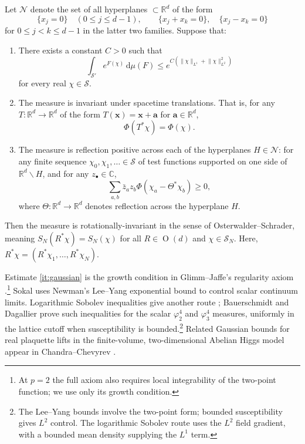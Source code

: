 \documentclass[11pt, letterpaper, reqno]{amsart}
\theoremstyle{definition}
\newenvironment{theorem}
{\pushQED{\qed}\renewcommand{\qedsymbol}{$\blacksquare\square$}\theoremxx}
{\popQED\endtheoremxx}
\theoremstyle{remark}
\newcommand{\bbC}{\mathbb{C}}
\newcommand{\bbR}{\mathbb{R}}
\newcommand{\calN}{\mathcal{N}}
\newcommand{\calS}{\mathcal{S}}
\newcommand{\bfa}{\mathbf{a}}
\newcommand{\bfx}{\mathbf{x}}
\newcommand{\dd}{\,\mathrm{d}}
\begin{document}
Let $\calN$ denote the set of all hyperplanes $\subset \bbR^d$ of the form 
\begin{equation}
    \{x_j=0\}\quad(0\leq j\leq d-1),\qquad \{x_j+x_k=0\},\quad \{x_j-x_k=0\}
\end{equation}
for $0\leq j<k\leq d-1$ in the latter two families. 
\begin{theorem} 
\label{thm:main}
Suppose that:
\begin{enumerate}[label=(\roman*)]
\item \label{it:gaussian} There exists a constant $C>0$ such that 
\begin{equation}\label{eq:gaussian}
    \int_{\calS'} e^{F(\chi)} \dd \mu(F) \leq e^{C(\lVert\chi\rVert_{L^1}+\lVert\chi\rVert_{L^2}^2)}
\end{equation}
for every real $\chi\in\calS$. 
\item  \label{it:cov}
The measure is invariant under spacetime translations. That is, for any $T:\bbR^d\to \bbR^d$ of the form $T(\bfx)=\bfx+\bfa$ for $\bfa\in \bbR^d$, 
\begin{equation}
    \Phi(T^* \chi) = \Phi(\chi). 
\end{equation}
\item The measure is reflection positive across each of the hyperplanes $H\in \calN$: for any finite sequence $\chi_0,\chi_1,\dots \in \calS$ of test functions supported on one side of $\bbR^d\backslash H$, and for any $z_\bullet\in \bbC$, 
\begin{equation}
    \sum_{a,b} \bar{z}_a z_b \Phi(\chi_a - \Theta^* \chi_b ) \geq 0,
\end{equation}
where $\Theta:\bbR^d\to\bbR^d$ denotes reflection across the hyperplane $H$. 
\label{it:RP}
\end{enumerate}
Then the measure is rotationally-invariant in the sense of Osterwalder--Schrader, meaning $S_N(R^* \chi) = S_N(\chi)$ for all $R\in \operatorname{O}(d)$ and $\chi\in \calS_N$. 
\end{theorem}
Here, $R^* \chi=(R^* \chi_1,\dots,R^* \chi_N)$. 


Estimate \ref{it:gaussian} is the growth condition in Glimm--Jaffe's
regularity axiom \cite[\S6.1, OS1, (6.1.5)]{GlimmJaffe1987}.\footnote{At
$p=2$ the full axiom also requires local integrability of the two-point
function; we use only its growth condition.}
Sokal \cite[(2.27), \S2.3]{Sokal} uses Newman's Lee--Yang exponential
bound \cite[Theorems~9--10, (3.5) and (4.6)]{Newman1975} to control
scalar continuum limits. Logarithmic Sobolev inequalities give another
route \cite[Proposition~2.3]{Ledoux1999}; Bauerschmidt and Dagallier
\cite[Theorem~1.1(i)]{BauerschmidtDagallier2024} prove such inequalities
for the scalar $\varphi^4_2$ and $\varphi^4_3$ measures, uniformly in
the lattice cutoff when susceptibility is bounded.\footnote{The
Lee--Yang bounds involve the two-point form; bounded susceptibility
gives $L^2$ control. The logarithmic Sobolev route uses the $L^2$ field
gradient, with a bounded mean density supplying the $L^1$ term.}
Related Gaussian bounds for real plaquette lifts in the finite-volume,
two-dimensional Abelian Higgs model appear in Chandra--Chevyrev
\cite[Theorem~4.6 and Corollary~4.8]{ChandraChevyrev2024}.
\end{document}
